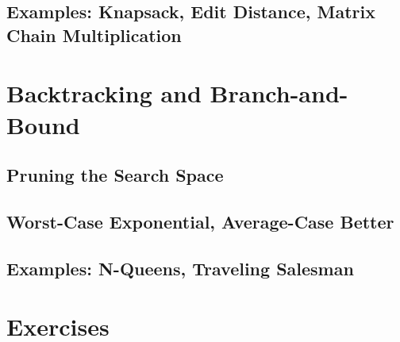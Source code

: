 \subsection{Examples: Knapsack, Edit Distance, Matrix Chain Multiplication}

\section{Backtracking and Branch-and-Bound}
\subsection{Pruning the Search Space}
\subsection{Worst-Case Exponential, Average-Case Better}
\subsection{Examples: N-Queens, Traveling Salesman}

\section{Exercises}